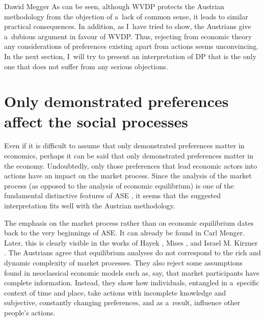 \begin{artengenv}{Dawid Megger}
As can be seen, although WVDP protects the Austrian methodology from the objection of a~lack of common sense, it leads to similar practical consequences. In addition, as I~have tried to show, the Austrians give a~dubious argument in favour of WVDP. Thus, rejecting from economic theory any considerations of preferences existing apart from actions seems unconvincing. In the next section, I~will try to present an interpretation of DP that is the only one that does not suffer from any serious objections.



\section{Only demonstrated preferences affect the social processes}

Even if it is difficult to assume that only demonstrated preferences matter in economics, perhaps it can be said that only demonstrated preferences matter in the economy. Undoubtedly, only those preferences that lead economic actors into actions have an impact on the market process. Since the analysis of the market process (as opposed to the analysis of economic equilibrium) is one of the fundamental distinctive features of ASE 
\parencites[][]{rothbard_present_2011}[][]{coyne_austrian_2015}, %
 it seems that the suggested interpretation fits well with the Austrian methodology.



The emphasis on the market process rather than on economic equilibrium dates back to the very beginnings of ASE. It can already be found in Carl Menger. Later, this is clearly visible in the works of Hayek 
\parencite*[][]{hayek_use_1945}, %
 Mises 
\parencite*[][]{mises_human_1998}, %
 and Israel M. Kirzner 
\parencite*[][]{kirzner_competition_1973}. %
 The Austrians agree that equilibrium analyses do not correspond to the rich and dynamic complexity of market processes. They also reject some assumptions found in neoclassical economic models such as, say, that market participants have complete information. Instead, they show how individuals, entangled in a~specific context of time and place, take actions with incomplete knowledge and subjective, constantly changing preferences, and as a~result, influence other people's actions.




\end{artengenv}
